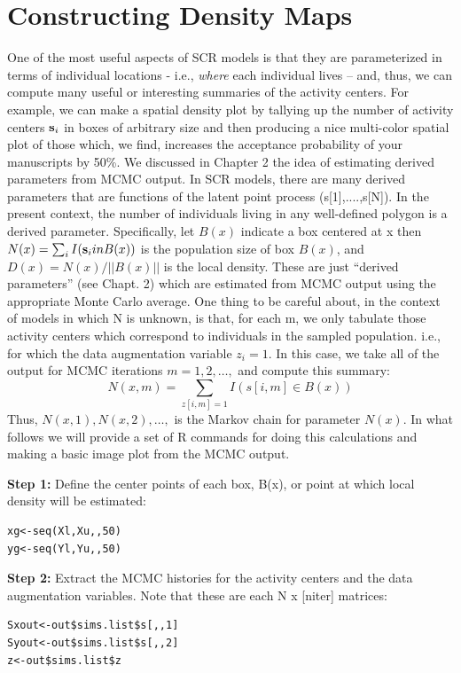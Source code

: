 \section{Constructing Density Maps}
One of the most useful aspects of SCR models is that they are
parameterized in terms of individual locations - i.e., {\it where}
each individual lives -- and, thus, we can compute many useful or interesting summaries of the activity centers.  For example, we can make a spatial density plot by tallying up the number of activity centers ${\bf s}_{i}$ in boxes of arbitrary size and then producing a nice multi-color spatial plot of those which, we find, increases the acceptance probability of your manuscripts by 50\%. 
We discussed in Chapter 2 the idea of estimating derived parameters from MCMC output. In SCR models, there are many derived parameters that are functions of the latent point process (s[1],....,s[N]). In the present context, the number of individuals living in any well-defined polygon is a derived parameter. Specifically, let $B(x)$ indicate a box centered at x then $N(x)=\sum_{i} I({\bf s}_{i} in B(x))$ is the population size of box $B(x)$, and $D(x) = N(x)/||B(x)||$ is the local density. These are just ``derived parameters'' (see Chapt. 2) which are estimated from MCMC output using the appropriate Monte Carlo average. One thing to be careful about, in the context of models in which N is unknown, is that, for each m, we only tabulate those activity centers which correspond to individuals in the sampled population. i.e., for which the data augmentation variable $z_{i}  = 1$.  In this case, we take all of the output for MCMC iterations $m=1,2,\ldots,$ and compute this summary:
\[
   N(x,m) = \sum_{z[i,m]=1} I(s[i,m] \in B(x))
\]
Thus, $N(x,1),N(x,2),\dots,$ is the Markov chain for parameter $N(x)$.  In what follows we will provide a set of R commands for doing this calculations and making a basic image plot from the MCMC output. 

{\flushleft \bf Step 1:} Define the center points of each box, B(x), or point at which local density will be estimated:
\begin{verbatim}
xg<-seq(Xl,Xu,,50)
yg<-seq(Yl,Yu,,50)
\end{verbatim}

{\flushleft \bf Step 2:} Extract the MCMC histories for the activity centers and the data augmentation variables.  Note that these are each N x [niter] matrices:
\begin{verbatim}
Sxout<-out$sims.list$s[,,1]
Syout<-out$sims.list$s[,,2]
z<-out$sims.list$z
\end{verbatim}

